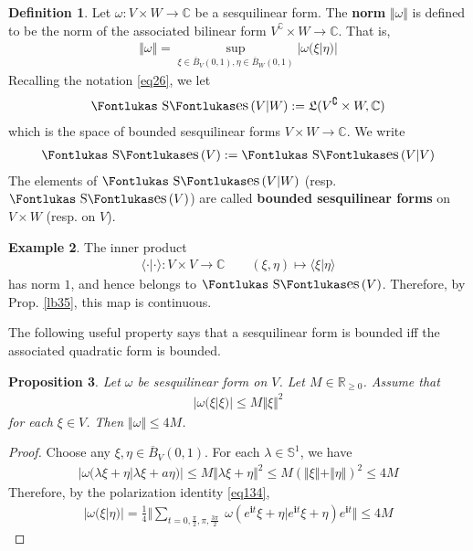 \documentclass[12pt,b5paper,notitlepage]{article}
\theoremstyle{definition}
\newtheorem{df}{Definition}[subsection]
\newtheorem{eg}[df]{Example}
\theoremstyle{plain}
\newtheorem{pp}[df]{Proposition}
\DeclareMathOperator{\Ses}{\text{\Fontlukas S}\text{\kern -0pt {\Fontlukas\large es}}\,}
\newcommand{\fk}{\mathfrak}
\newcommand{\ovl}{\overline}
\newcommand{\bk}[1]{\langle {#1}\rangle}
\newcommand{\im}{\mathbf{i}}
\newcommand{\Co}{\complement}
\newcommand{\Cbb}{\mathbb C}
\newcommand{\Rbb}{\mathbb R}
\newcommand{\Sbb}{{\mathbb S}}
\numberwithin{equation}{section}
\begin{document}
\begin{df}
Let $\omega:V\times W\rightarrow\Cbb$ be a sesquilinear form. The \textbf{norm}  $\Vert\omega\Vert$ is defined to be the norm of the associated bilinear form $V^\Co\times W\rightarrow\Cbb$. That is, 
\begin{align*}
\Vert\omega\Vert=\sup_{\xi\in\ovl B_V(0,1),\eta\in\ovl B_W(0,1)}|\omega(\xi|\eta)|
\end{align*}
Recalling the notation \eqref{eq26}, we let \index{Sesq@$\Ses(V\vert W)$ and $\Ses(V)$}
\begin{align*}
\Ses(V|W):=\fk L(V^\Co\times W,\Cbb)
\end{align*}
which is the space of bounded sesquilinear forms $V\times W\rightarrow\Cbb$. We write
\begin{align*}
\Ses(V):=\Ses(V|V)
\end{align*}
The elements of $\Ses(V|W)$ (resp. $\Ses(V)$) are called \textbf{bounded sesquilinear forms}  on $V\times W$ (resp. on $V$).
\end{df}


\begin{eg}\label{lb125}
The inner product
\begin{align*}
\bk{\cdot|\cdot}:V\times V\rightarrow\Cbb\qquad (\xi,\eta)\mapsto\bk{\xi|\eta}
\end{align*}
has norm $1$, and hence belongs to $\Ses(V)$. Therefore, by Prop. \ref{lb35}, this map is continuous.
\end{eg}

The following useful property says that a sesquilinear form is bounded iff the associated quadratic form is bounded.

\begin{pp}\label{lb238}
Let $\omega$ be sesquilinear form on $V$. Let $M\in\Rbb_{\geq0}$. Assume that
\begin{align*}
|\omega(\xi|\xi)|\leq M\Vert\xi\Vert^2
\end{align*}
for each $\xi\in V$. Then $\Vert\omega\Vert\leq 4M$.
\end{pp}

\begin{proof}
Choose any $\xi,\eta\in \ovl B_V(0,1)$. For each $\lambda\in\Sbb^1$, we have
\begin{align*}
|\omega(\lambda\xi+\eta|\lambda\xi+a\eta)|\leq M\Vert \lambda\xi+\eta\Vert^2\leq M(\Vert\xi\Vert+\Vert\eta\Vert)^2\leq 4M
\end{align*}
Therefore, by the polarization identity \eqref{eq134},
\begin{align*}
|\omega(\xi|\eta)|=\frac 14\Big\Vert\sum_{t=0,\frac \pi 2,\pi,\frac{3\pi}2}~ \omega(e^{\im t}\xi+\eta|e^{\im t}\xi+
\eta)e^{\im t}\Big\Vert\leq 4M
\end{align*}
\end{proof}
\end{document}
